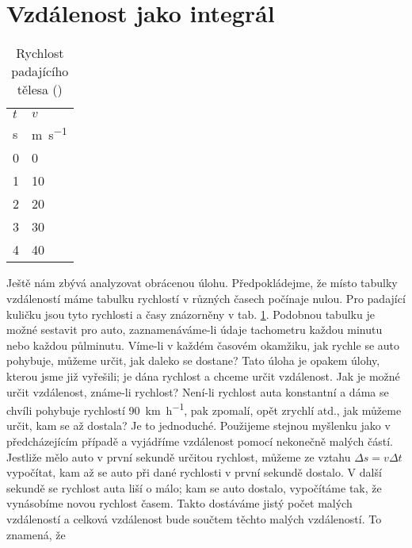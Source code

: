   \section{Vzdálenost jako integrál}
    \begin{table}[ht!]        %
      \centering
      \renewcommand{\arraystretch}{1.0}
      \begin{tabular}{>{\centering\arraybackslash}p{2em}|>{\centering\arraybackslash}p{3em}}
        \hline  \(t\)    & \(v\)          \\
                 \si{\s} & \si{\m\per\s}  \\
         \hline  \num{0} & \num{0}        \\
                 \num{1} & \num{10}       \\
                 \num{2} & \num{20}       \\
                 \num{3} & \num{30}       \\
                 \num{4} & \num{40}       \\
        \hline 
      \end{tabular}
      \caption{Rychlost padajícího tělesa (\cite[s.~115]{Feynman01})}
      \label{fyz:tab004}
    \end{table}
    Ještě nám zbývá analyzovat obrácenou úlohu. Předpokládejme, že místo tabulky vzdáleností máme 
    tabulku rychlostí v různých časech počínaje nulou. Pro padající kuličku jsou tyto rychlosti a 
    časy znázorněny v tab. \ref{fyz:tab004}. Podobnou tabulku je možné sestavit pro auto, 
    zaznamenáváme-li údaje tachometru každou minutu nebo každou půlminutu. Víme-li v každém časovém 
    okamžiku, jak rychle se auto pohybuje, můžeme určit, jak daleko se dostane? Tato úloha je 
    opakem úlohy, kterou jsme již vyřešili; je dána rychlost a chceme určit vzdálenost. Jak je 
    možné určit vzdálenost, známe-li rychlost? Není-li rychlost auta konstantní a dáma se chvíli 
    pohybuje rychlostí \SI{90}{\km\per\hour}, pak zpomalí, opět zrychlí atd., jak můžeme určit, kam 
    se až dostala? Je to jednoduché. Použijeme stejnou myšlenku jako v předcházejícím případě a 
    vyjádříme vzdálenost pomocí nekonečně malých částí. Jestliže mělo auto v první sekundě určitou 
    rychlost, můžeme ze vztahu \(\Delta s = v\Delta t\) vypočítat, kam až se auto při dané 
    rychlosti v první sekundě dostalo. V další sekundě se rychlost auta liší o málo; kam se auto 
    dostalo, vypočítáme tak, že vynásobíme novou rychlost časem. Takto dostáváme jistý počet malých 
    vzdáleností a celková vzdálenost bude součtem těchto malých vzdáleností. To znamená, že 

